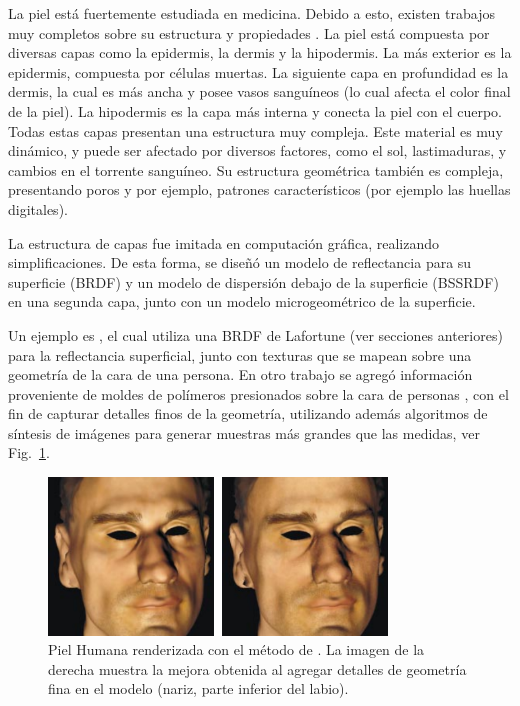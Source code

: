 La piel está fuertemente estudiada en medicina.
Debido a esto, existen trabajos muy completos sobre su estructura y propiedades \cite{Walters2002}.
La piel está compuesta por diversas capas como la epidermis, la dermis y la hipodermis.
La más exterior es la epidermis, compuesta por células muertas.
La siguiente capa en profundidad es la dermis, la cual es más ancha y posee vasos sanguíneos (lo cual afecta el color final de la piel).
La hipodermis es la capa más interna y conecta la piel con el cuerpo.
Todas estas capas presentan una estructura muy compleja.
Este material es muy dinámico, y puede ser afectado por diversos factores, como el sol, lastimaduras, y cambios en el torrente sanguíneo.
Su estructura geométrica también es compleja, presentando poros y por ejemplo, patrones característicos (por ejemplo las huellas digitales).

La estructura de capas fue imitada en computación gráfica, realizando simplificaciones.
De esta forma, se diseñó un modelo de reflectancia para su superficie (BRDF) y un modelo de dispersión debajo de la superficie (BSSRDF) en una segunda capa, junto con un modelo microgeométrico de la superficie.

Un ejemplo es \cite{Marschner2000}, el cual utiliza una BRDF de Lafortune (ver secciones anteriores) para la reflectancia superficial, junto con texturas que se mapean sobre una geometría de la cara de una persona.
En otro trabajo se agregó información proveniente de moldes de polímeros presionados sobre la cara de personas \cite{Haro2001}, con el fin de capturar detalles finos de la geometría, utilizando además algoritmos de síntesis de imágenes para generar muestras más grandes que las medidas, ver Fig.~\ref{fg:piel}.

\begin{figure}
\center
\includegraphics[width=9cm]{figures/piel}
\caption{Piel Humana renderizada con el método de \cite{Marschner2000}. La imagen de la derecha muestra la mejora obtenida al agregar detalles de geometría fina en el modelo (nariz, parte inferior del labio).}
\label{fg:piel}
\end{figure}

